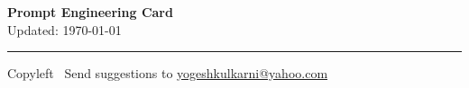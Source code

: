 



\begin{center}
     \Large{\textbf{Prompt Engineering Card}}  \\ \small Updated: \today 
\end{center}

\raggedright
\footnotesize
\begin{multicols}{2}





\vspace{2mm}

\rule{0.3\linewidth}{0.25pt}

\scriptsize
Copyleft \textcopyleft\  Send suggestions to 
\href{http://www.yogeshkulkarni.com}{yogeshkulkarni@yahoo.com}

\end{multicols}

